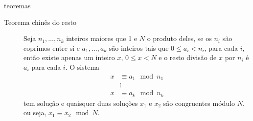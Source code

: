 \begin{frame}[allowframebreaks]
\framebreak
\begin{block}{teoremas}
  \begin{description}
  \item[Teorema chinês do resto] Seja $n_1,\ldots,n_k$ inteiros maiores que 1 e $N$ o produto deles,
    se os $n_i$ são coprimos entre si e $a_1,\ldots,a_k$ são inteiros tais que $0 \leq a_i < n_i$, para cada $i$,
    então existe apenas um inteiro $x$, $0 \leq x < N$ e o resto divisão de $x$ por $n_i$ é $a_i$ para cada $i$.
    O sistema
    \begin{eqnarray}
      x &\equiv a_1 \mod n_1 \\
        & \vdots \nonumber\\
      x &\equiv a_k \mod n_k \nonumber
    \end{eqnarray}
    tem solução e quaisquer duas soluções $x_1$ e $x_2$ são congruentes módulo $N$, ou seja, $x_1 \equiv x_2 \mod N$.
\end{description}
\end{block}

\end{frame}
